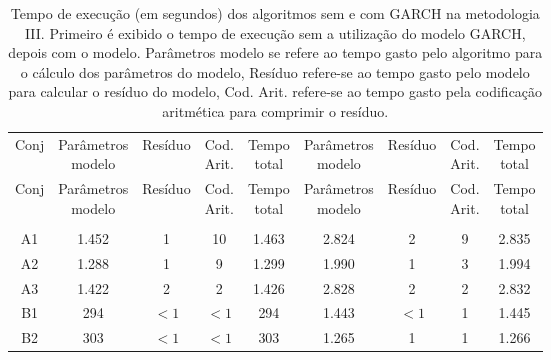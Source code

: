 \begin{center}
\begin{longtable}{ccccc|cccc}
\toprule
\rowcolor{white}
\caption[Metodologia III: tempo de execução]{Tempo de execução (em segundos)
dos algoritmos sem e com GARCH na metodologia III. Primeiro é exibido o tempo de
execução sem a utilização do modelo GARCH, depois com o modelo. Parâmetros
modelo se refere ao tempo gasto pelo algoritmo para o cálculo dos parâmetros do
modelo, Resíduo refere-se ao tempo gasto pelo modelo para calcular o resíduo do
modelo, Cod. Arit. refere-se ao tempo gasto pela codificação aritmética para
comprimir o resíduo.} \label{tab:EvolucaoEntropiaMet3}\\
\midrule
Conj & \specialcell{Parâmetros\\modelo} &
Resíduo & \specialcell{Cod.\\Arit.} & \specialcell{Tempo\\total} &
\specialcell{Parâmetros\\modelo} &
Resíduo & \specialcell{Cod.\\Arit.} & \specialcell{Tempo\\total} \\
\midrule
\endfirsthead 
\midrule
\rowcolor{white}
Conj & \specialcell{Parâmetros\\modelo} &
Resíduo & \specialcell{Cod.\\Arit.} & \specialcell{Tempo\\total} &
\specialcell{Parâmetros\\modelo} &
Resíduo & \specialcell{Cod.\\Arit.} & \specialcell{Tempo\\total} \\
\toprule
\endhead
\midrule \\ %
\endfoot
\bottomrule 
\endlastfoot
    A1    & 1.452 & 1     & 10    & 1.463 & 2.824 & 2     & 9     & 2.835 \\
    A2    & 1.288 & 1     & 9     & 1.299 & 1.990 & 1     & 3     & 1.994 \\
    A3    & 1.422 & 2     & 2     & 1.426 & 2.828 & 2     & 2     & 2.832 \\
    B1    & 294   & $<1$     & $<1$     & 294   & 1.443 & $<1$     & 1     & 1.445 \\
    B2    & 303   & $<1$     & $<1$     & 303   & 1.265 & 1     & 1     & 1.266 \\

\end{longtable}
\end{center}
